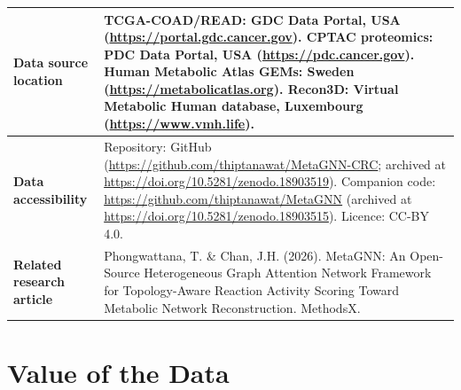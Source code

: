 \documentclass[12pt,a4paper]{article}
\begin{document}
\begin{tabularx}{\textwidth}{@{}p{3.5cm}X@{}}
\midrule
\textbf{Data source location} & TCGA-COAD/READ: GDC Data Portal, USA (\url{https://portal.gdc.cancer.gov}). CPTAC proteomics: PDC Data Portal, USA (\url{https://pdc.cancer.gov}). Human Metabolic Atlas GEMs: Sweden (\url{https://metabolicatlas.org}). Recon3D: Virtual Metabolic Human database, Luxembourg (\url{https://www.vmh.life}). \\
\midrule
\textbf{Data accessibility} & Repository: GitHub (\url{https://github.com/thiptanawat/MetaGNN-CRC}; archived at \url{https://doi.org/10.5281/zenodo.18903519}). Companion code: \url{https://github.com/thiptanawat/MetaGNN} (archived at \url{https://doi.org/10.5281/zenodo.18903515}). Licence: CC-BY 4.0. \\
\midrule
\textbf{Related research article} & Phongwattana, T. \& Chan, J.H. (2026). MetaGNN: An Open-Source Heterogeneous Graph Attention Network Framework for Topology-Aware Reaction Activity Scoring Toward Metabolic Network Reconstruction. MethodsX. \\
\bottomrule
\end{tabularx}

\section*{Value of the Data}
\end{document}
